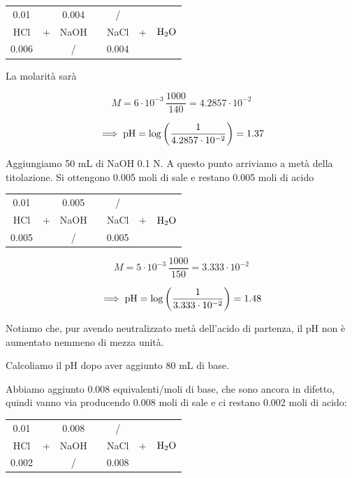 \begin{center}
    \begin{tabular}{ccccccc}
        0.01 &  & 0.004 & & / & &\\
        HCl & + & NaOH & \ce{->} & NaCl & + & $\rm H_2O$\\
        0.006 &  &  / & & 0.004 & &\\
    \end{tabular}
\end{center}

La molarità sarà

$$M=6\cdot 10^{-3} \, \frac{1000}{140}=4.2857\cdot 10^{-2}$$

$$\implies \rm pH=\log\left( \frac{1}{4.2857 \cdot 10^{-2}} \right)=1.37$$

Aggiungiamo 50 mL di NaOH 0.1 N. A questo punto arriviamo a metà della titolazione. Si ottengono 0.005 moli di sale e restano 0.005 moli di acido

\begin{center}
    \begin{tabular}{ccccccc}
        0.01 &  & 0.005 & & / & &\\
        HCl & + & NaOH & \ce{->} & NaCl & + & $\rm H_2O$\\
        0.005 &  &  / & & 0.005 & &\\
    \end{tabular}
\end{center}

$$M=5 \cdot 10^{-3} \, \frac{1000}{150}=3.333 \cdot 10^{-2}$$

$$\implies \rm pH = \log \left( \frac{1}{3.333 \cdot 10^{-2}} \right)=1.48$$

Notiamo che, pur avendo neutralizzato metà dell'acido di partenza, il pH non è aumentato nemmeno di mezza unità.

\vspace{0.2cm}Calcoliamo il pH dopo aver aggiunto 80 mL di base.

Abbiamo aggiunto 0.008 equivalenti/moli di base, che sono ancora in difetto, quindi vanno via producendo 0.008 moli di sale e ci restano 0.002 moli di acido:

\begin{center}
    \begin{tabular}{ccccccc}
        0.01 &  & 0.008 & & / & &\\
        HCl & + & NaOH & \ce{->} & NaCl & + & $\rm H_2O$\\
        0.002 &  &  / & & 0.008 & &\\
    \end{tabular}
\end{center}

